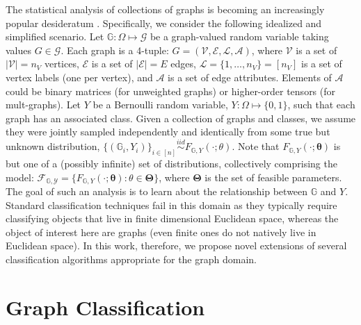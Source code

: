 \documentclass{article} %
\providecommand{\ve}[1]{\boldsymbol{#1}}
\newcommand{\bth}{\ve{\theta}}
\newcommand{\bTh}{\ve{\Theta}}
\providecommand{\mc}[1]{\mathcal{#1}}
\newcommand{\iid}{\overset{iid}{\sim}}
\newcommand{\GG}{\mathbb{G}}
\begin{document}
The statistical analysis of collections of graphs is becoming an increasingly popular desideratum \cite{Bunke2011}.  Specifically, we consider the following idealized and simplified scenario. Let $\GG: \Omega \mapsto \mc{G}$ be a graph-valued random variable taking values $G\in \mc{G}$. Each graph is a 4-tuple: $G=(\mc{V},\mc{E},\mc{L},\mc{A})$, where $\mc{V}$ is a set of $|\mc{V}|=n_V$ vertices, $\mc{E}$ is a set of $|\mc{E}|=E$ edges, $\mc{L}=\{1,\ldots,n_V\}=[n_V]$ is a set of vertex labels (one per vertex), and $\mc{A}$ is a set of edge attributes.  Elements of $\mc{A}$ could be binary matrices (for unweighted graphs) or higher-order tensors (for mult-graphs).  Let $Y$ be a Bernoulli random variable, $Y: \Omega \mapsto \{0,1\}$, such that each graph has an associated class.  Given a collection of graphs and classes,  we assume they were jointly sampled independently and identically from some true but unknown distribution, $\{(\GG_i,Y_i)\}_{i \in [n]} \iid F_{\GG,Y}(\cdot; \theta)$.  Note that $F_{\GG,Y}(\cdot; \bth)$ is but one of a (possibly infinite) set of distributions, collectively comprising the model: $\mc{F_{\GG,Y}}=\{F_{\GG,Y}(\cdot; \bth) : \theta \in \bTh\}$, where $\bTh$ is the set of feasible parameters.  The goal of such an analysis is to learn about the relationship between $\GG$ and $Y$.   Standard classification techniques fail in this domain as they typically require classifying objects that live in finite dimensional Euclidean space, whereas the object of interest here are graphs (even finite ones do not natively live in Euclidean space).  In this work, therefore, we propose novel extensions of several classification algorithms appropriate for the graph domain.



\section{Graph Classification} %
\label{sec:graph_classification}
\end{document}

